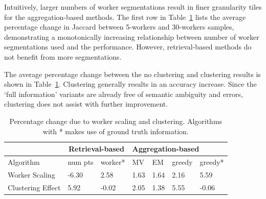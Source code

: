 \par \noindent Intuitively, larger numbers of worker segmentations result in finer granularity tiles for the aggregation-based methods. The first row in Table~\ref{statsTable} lists the average percentage change in Jaccard between 5-workers and 30-workers samples, demonstrating a monotonically increasing relationship between number of worker segmentations used and the performance. However, retrieval-based methods do not benefit from more segmentations.

\par \noindent The average percentage change between the no clustering and clustering results is shown in Table~\ref{statsTable}. Clustering generally results in an accuracy increase. Since the `full information' variants are already free of semantic ambiguity and errors, clustering does not assist with further improvement. %
\begin{table}[h!]
   \small
     \setlength\tabcolsep{1.5pt}
      \begin{tabular}{l|l|l|l|l|l|l}
         & \multicolumn{2}{c|}{Retrieval-based} & \multicolumn{4}{l}{Aggregation-based} \\ \hline
      Algorithm         & num pts         & worker*        & MV    & EM    & greedy  & greedy*  \\ \hline
      Worker Scaling    & -6.30           & 2.58               & 1.63  & 1.64  & 2.16    & 5.59         \\ \hline
      Clustering Effect & 5.92            & -0.02              & 2.05  & 1.38  & 5.55    & -0.06       
      \end{tabular}
      \caption{Percentage change due to worker scaling and clustering. Algorithms with * makes use of ground truth information.}
      \label{statsTable}
\end{table}